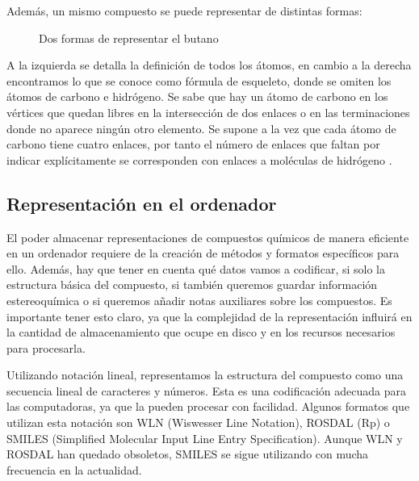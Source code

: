 Además, un mismo compuesto se puede representar de distintas formas:
\begin{figure}[H]
\centering
    \caption{Dos formas de representar el butano} \label{fig:figura2}
\end{figure}

A la izquierda se detalla la definición de todos los átomos, en cambio a la derecha encontramos lo que se conoce como fórmula de esqueleto, donde se omiten los átomos de carbono e hidrógeno. Se sabe que hay un átomo de carbono en los vértices que quedan libres en la intersección de dos enlaces o en las terminaciones donde no aparece ningún otro elemento. Se supone a la vez que cada átomo de carbono tiene cuatro enlaces, por tanto el número de enlaces que faltan por indicar explícitamente se corresponden con enlaces a moléculas de hidrógeno \cite{formestructural,structrep}.


\subsection*{Representación en el ordenador}
El poder almacenar representaciones de compuestos químicos de manera eficiente en un ordenador requiere de la creación de métodos y formatos específicos para ello. Además, hay que tener en cuenta qué datos vamos a codificar, si solo la estructura básica del compuesto, si también queremos guardar información estereoquímica o si queremos añadir notas auxiliares sobre los compuestos. Es importante tener esto claro, ya que la complejidad de la representación influirá en la cantidad de almacenamiento que ocupe en disco y en los recursos necesarios para procesarla.

Utilizando notación lineal, representamos la estructura del compuesto como una secuencia lineal de caracteres y números. Esta es una codificación adecuada para las computadoras, ya que la pueden procesar con facilidad. Algunos formatos que utilizan esta notación son WLN (Wiswesser Line Notation), ROSDAL (Rp) o SMILES (Simplified Molecular Input Line Entry Specification). Aunque WLN y ROSDAL han quedado obsoletos, SMILES se sigue utilizando con mucha frecuencia en la actualidad. \cite{doi:10.1021/ci600234z}

